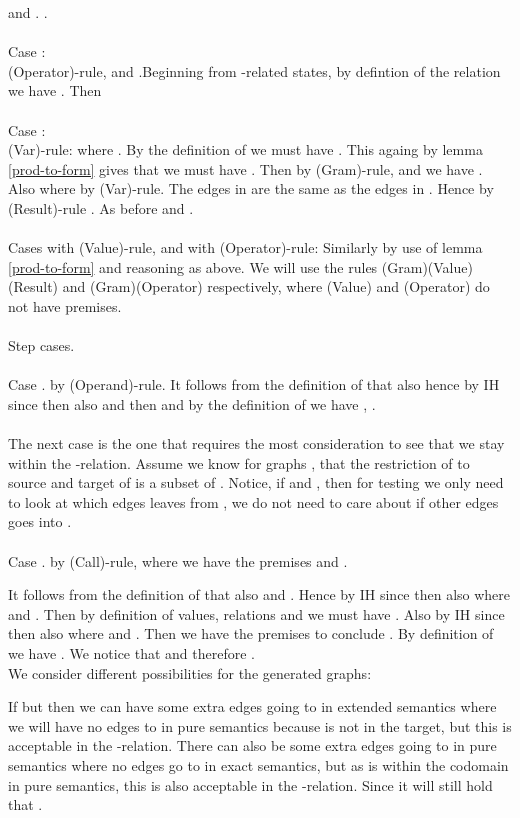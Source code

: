 \documentclass{LMCS}
\theoremstyle{definition}\newtheorem{env}[thm]{Environment}
\begin{document}
and . .\\
\\
Case :\\ 
(Operator)-rule,  and 
.Beginning from -related states, by defintion of the relation  we have . Then \\
\\
Case : \\
(Var)-rule:  where .  
By the definition of  we must have . This againg by lemma \ref{prod-to-form} gives that we must have . Then  by (Gram)-rule, and we have . Also  where  by (Var)-rule. 
The edges in  are the same as the edges in .
Hence by (Result)-rule . 
As before  and .\\
\\
Cases  with (Value)-rule, and  with (Operator)-rule: Similarly by use of lemma \ref{prod-to-form} and reasoning as above. We will use the rules (Gram)(Value) (Result) and (Gram)(Operator) respectively, where (Value) and (Operator) do not have premises.\\
\\
Step cases.\\
\\
Case .  by (Operand)-rule.
It follows from the definition of  that also  hence by IH since  then also  and then  and by the definition of  we have , .\\
\\
The next case is the one that requires the most consideration to see that we stay within the -relation. Assume we know for graphs , that the restriction of  to source and target of  is a subset of . Notice, if  and  , then for testing  we only need to look at which edges leaves from , we do not need to care about if other edges goes into .\\
\\
Case .  by (Call)-rule, where we have the premises  and .  


It follows from the definition of  that also  and . Hence by IH since  then also  where  and . Then by definition of values, relations  and  we must have . Also by IH since  then also  where  and . Then we have the premises to conclude . By definition of  we have . 
We notice that  and therefore .\\
We consider different possibilities for the generated graphs:

If  but  then we can have some extra edges going to  in extended semantics where we will have no edges to  in pure semantics because  is not in the target, but this is acceptable in the -relation. There can also be some extra edges going to  in pure semantics where no edges go to  in exact semantics, but as  is within the codomain in pure semantics, this is also acceptable in the -relation. Since  it will still hold that . 
\end{document}
